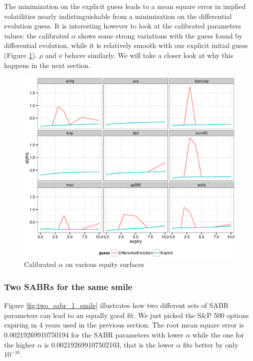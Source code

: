 \documentclass[]{rAMF2e}
\begin{document}
The minimization on the explicit guess leads to a mean square error in implied volatilities nearly indistinguishable from a minimization on the differential evolution guess. It is interesting however to look at the calibrated parameters values: the calibrated $\alpha$ shows some strong variations with the guess found by differential evolution, while it is relatively smooth with our explicit initial guess (Figure  \ref{fig:explicit_de_equity_alpha}). $\rho$ and $\nu$ behave similarly. We will take a closer look at why this happens in the next section.
\begin{figure}[!h]
  \caption{\label{fig:explicit_de_equity_alpha}Calibrated $\alpha$ on various equity surfaces}
\begin{center}
 \includegraphics[width=16cm]{explicit_de_equity_alpha.eps}
\end{center}
\end{figure}


\subsubsection{Two SABRs for the same smile}
Figure \ref{fig:two_sabr_1_smile} illustrates how two different sets of SABR parameters can lead to an equally good fit. We just picked the S\&P 500 options expiring in 4 years used in the previous section. The root mean square error is  0.00219269910750194 for the SABR parameters with lower $\alpha$ while the one for the higher $\alpha$ is 0.002192699107502103, that is the lower $\alpha$ fits better by only $10^{-16}$.
\end{document}
